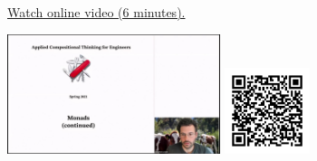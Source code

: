
\begin{minipage}{10cm}
    \href{https://act4e-spring21.netlify.app/videos/spring2021-monads-b:another-persp-mon.html}{Watch online video (6 minutes).}
        
    \href{https://act4e-spring21.netlify.app/videos/spring2021-monads-b:another-persp-mon.html}{\includegraphics[height=3.5cm]{spring2021-monads-b:another-persp-mon/thumbnails.jpg}}
    \href{https://act4e-spring21.netlify.app/videos/spring2021-monads-b:another-persp-mon.html}{\includegraphics[height=2.5cm]{spring2021-monads-b:another-persp-mon/qrcode.png}}
\end{minipage}
